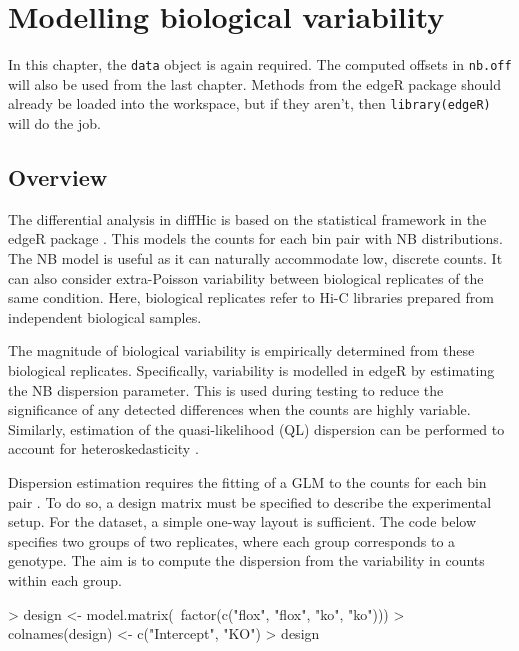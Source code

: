 \documentclass[12pt]{report}
\renewenvironment{Schunk}{\vspace{0pt}}{\vspace{0pt}}
\newcommand{\edgeR}{edgeR}
\newcommand{\pkgname}{diffHic}
\newcommand{\code}[1]{{\small\texttt{#1}}}
\newenvironment{combox}
{ \begin{shaded}\begin{center}\begin{minipage}[t]{0.95\textwidth} }
{ \end{minipage}\end{center}\end{shaded} }
\begin{document}
\chapter{Modelling biological variability}

\begin{combox}
In this chapter, the \code{data} object is again required.
The computed offsets in \code{nb.off} will also be used from the last chapter.
Methods from the \edgeR{} package should already be loaded into the workspace, but if they aren't, then \code{library(edgeR)} will do the job.
\end{combox}

\section{Overview}
The differential analysis in \pkgname{} is based on the statistical framework in the \edgeR{} package \citep{edgeR}.
This models the counts for each bin pair with NB distributions.
The NB model is useful as it can naturally accommodate low, discrete counts.
It can also consider extra-Poisson variability between biological replicates of the same condition.
Here, biological replicates refer to Hi-C libraries prepared from independent biological samples.

The magnitude of biological variability is empirically determined from these biological replicates.
Specifically, variability is modelled in \edgeR{} by estimating the NB dispersion parameter.
This is used during testing to reduce the significance of any detected differences when the counts are highly variable.
Similarly, estimation of the quasi-likelihood (QL) dispersion can be performed to account for heteroskedasticity \citep{lund2012ql}. 

Dispersion estimation requires the fitting of a GLM to the counts for each bin pair \citep{mccarthy2012glm}. 
To do so, a design matrix must be specified to describe the experimental setup.
For the \citeauthor{sofueva2013cohesin} dataset, a simple one-way layout is sufficient.
The code below specifies two groups of two replicates, where each group corresponds to a genotype.
The aim is to compute the dispersion from the variability in counts within each group.

\begin{Schunk}
\begin{Sinput}
> design <- model.matrix(~factor(c("flox", "flox", "ko", "ko")))
> colnames(design) <- c("Intercept", "KO")
> design
\end{Sinput}
\end{Schunk}
\end{document}
